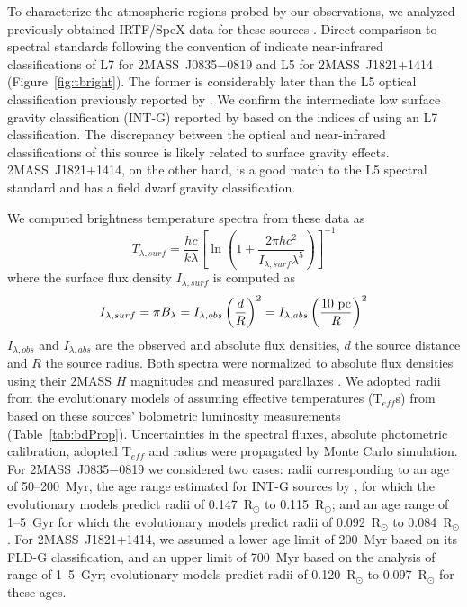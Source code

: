 \documentclass[twocolumn]{aastex6}
\newcommand{\teff}{T$_{eff}$}
\newcommand{\sha}{2MASS~J0835$-$0819}
\newcommand{\shb}{2MASS~J1821+1414}
\begin{document}
To characterize the atmospheric regions probed by our observations, we analyzed previously 
obtained IRTF/SpeX data for these sources \citep{2008ApJ...686..528L,2010ApJ...710.1142B}.
Direct comparison to spectral standards following the convention of \citet{2010ApJS..190..100K} indicate near-infrared
classifications of L7 for {\sha} and L5 for {\shb} (Figure~\ref{fig:tbright}). The former is considerably later than the L5 optical classification previously reported by \citet{2003AJ....126.2421C}. We confirm the intermediate low surface gravity classification (INT-G) reported by \citet{2016ApJ...833...96L} based on the indices of \citet{2013ApJ...772...79A} using an L7 classification. The discrepancy between the optical and near-infrared classifications of this source is likely related to surface gravity effects. {\shb}, on the other hand, is a good match to the L5 spectral standard and has a field dwarf gravity classification.

We computed brightness temperature spectra from these data as
\begin{equation}
T_{\lambda,surf} = \frac{hc}{k\lambda}\left[\ln\left(1+\frac{2\pi{hc^2}}{I_{\lambda,surf}\lambda^5}\right)\right]^{-1}
\end{equation}
where the surface flux density $I_{\lambda,surf}$ is computed as
\begin{equation}
I_{\lambda,surf} = {\pi}B_{\lambda} = I_{\lambda,obs}\left(\frac{d}{R}\right)^2 = I_{\lambda,abs}\left(\frac{10~{\rm pc}}{R}\right)^2
\end{equation}
$I_{\lambda,obs}$ and $I_{\lambda,abs}$ are the observed and absolute flux densities, $d$ the source distance and $R$ the source radius.  Both spectra were normalized to absolute flux densities using their 2MASS $H$ magnitudes and measured parallaxes \citep{2016MNRAS.455..357S,2016AJ....152...24W}. We adopted radii from the evolutionary models of \citet{2003A&A...402..701B} assuming effective temperatures ({\teff}s) from \citet{2015ApJ...810..158F} based on these sources' bolometric luminosity measurements (Table~\ref{tab:bdProp}). Uncertainties in the spectral fluxes, absolute photometric calibration, adopted {\teff} and radius were propagated by Monte Carlo simulation.  For {\sha} we considered two cases: radii corresponding to an age of 50--200~Myr, the age range estimated for INT-G sources by \citet{2013ApJ...772...79A}, for which the evolutionary models predict radii of 0.147~R$_{\odot}$ to 0.115~R$_{\odot}$; and an age range of 1--5~Gyr for which the evolutionary models predict radii of 0.092~R$_{\odot}$ to 0.084~R$_{\odot}$.
For {\shb}, we assumed a lower age limit of 200~Myr based on its FLD-G classification, and an upper limit of 700~Myr based on the analysis of \citet{2016MNRAS.455..357S} range of 1--5~Gyr; evolutionary models predict radii of 0.120~R$_{\odot}$ to 0.097~R$_{\odot}$ for these ages.  
\end{document}

